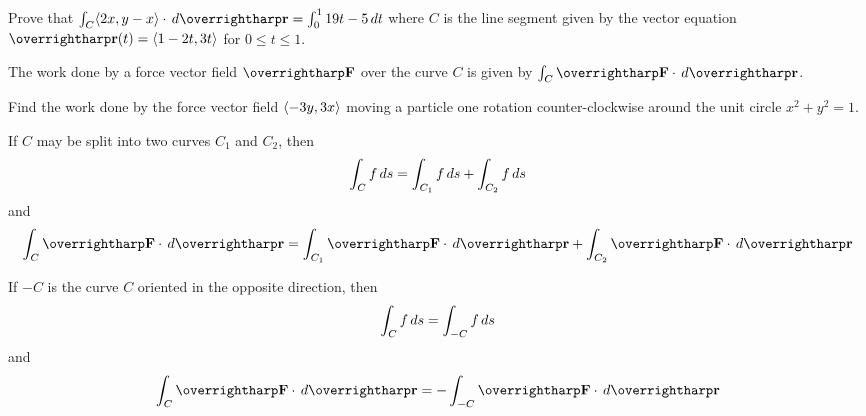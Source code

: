 \documentclass[letterpaper, twoside, 12pt]{book}
\begin{document}
          \begin{problem}
            Prove that
            $\int_C \<2x,y-x\>\cdot\dvar{\vect{r}}
              =
            \int_0^1 19t-5 \dvar{t}$
            where $C$ is the line segment given by the vector equation
            $\vect{r}(t)=\<1-2t,3t\>$ for $0\leq t\leq 1$.
          \end{problem}

          \begin{solution}

          \end{solution}

          \begin{contributors}

          \end{contributors}

\begin{remark}
  The work done by a force vector field $\vect{F}$ over the curve $C$
  is given by $\int_C\vect{F}\cdot\dvar{\vect{r}}$.
\end{remark}

          \begin{problem}
            Find the work done by the force vector field
            $\langle-3y,3x\rangle$ moving a particle one rotation counter-clockwise
            around the unit circle $x^2+y^2=1$.
          \end{problem}

          \begin{solution}

          \end{solution}

          \begin{contributors}

          \end{contributors}

\begin{theorem}
  If $C$ may be split into two curves $C_1$ and $C_2$, then
  \[
    \int_C f\,d{s}
      =
    \int_{C_1} f\,d{s}
      +
    \int_{C_2} f\,d{s}
  \]
  and
  \[
    \int_C \vect F\cdot\dvar{\vect r}
      =
    \int_{C_1} \vect F\cdot\dvar{\vect r}
      +
    \int_{C_2} \vect F\cdot\dvar{\vect r}
  \]
\end{theorem}

\begin{theorem}
  If $-C$ is the curve $C$ oriented in the opposite direction, then
  \[
    \int_C f\,d{s}
      =
    \int_{-C} f\,d{s}
  \]
  and
  \[
    \int_C \vect F\cdot\dvar{\vect r}
      =
    - \int_{-C} \vect F\cdot\dvar{\vect r}
  \]
\end{theorem}
\end{document}
